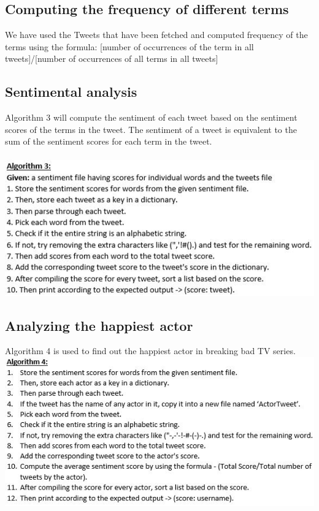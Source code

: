 \documentclass[11pt,english]{article}
\begin{document}
\subsection{Computing the frequency of different terms}
We have used the Tweets that have been fetched and computed frequency of the terms using the formula:
[number of occurrences of the term in all tweets]/[number of occurrences of all terms in all tweets]

\subsection{Sentimental analysis}
Algorithm 3 will compute the sentiment of each tweet based on the sentiment scores of the
terms in the tweet. The sentiment of a tweet is equivalent to the sum of the sentiment scores for
each term in the tweet.\\ \\
\includegraphics{algo3.jpg}

\subsection{Analyzing the happiest actor}
Algorithm 4 is used to find out the happiest actor in breaking bad TV series.\\
\includegraphics{algo4.jpg}
\end{document}
